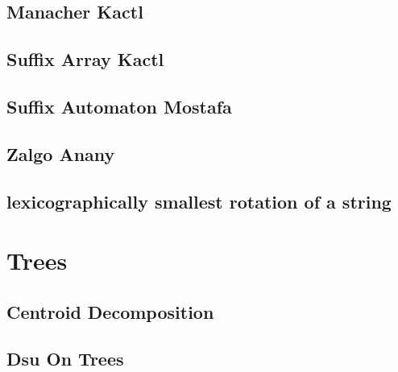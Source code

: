 \subsection{Manacher Kactl}
\vspace{-2ex}
\raggedbottom
\vspace{-3.2ex}
\hrulefill
\subsection{Suffix Array Kactl}
\vspace{-2ex}
\raggedbottom
\vspace{-3.2ex}
\hrulefill
\subsection{Suffix Automaton Mostafa}
\vspace{-2ex}
\raggedbottom
\vspace{-3.2ex}
\hrulefill
\subsection{Zalgo Anany}
\vspace{-2ex}
\raggedbottom
\vspace{-3.2ex}
\hrulefill
\subsection{lexicographically smallest rotation of a string}
\vspace{-2ex}
\raggedbottom
\vspace{-3.2ex}
\hrulefill

\section{Trees}
\subsection{Centroid Decomposition}
\vspace{-2ex}
\raggedbottom
\vspace{-3.2ex}
\hrulefill
\subsection{Dsu On Trees}
\vspace{-2ex}
\raggedbottom
\vspace{-3.2ex}
\hrulefill
